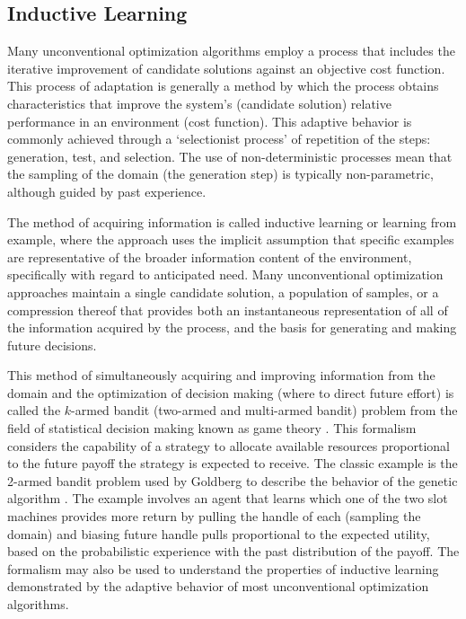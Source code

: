 \begin{bibunit}
% 
% 
\subsection{Inductive Learning}
\label{subsec:induction}
Many unconventional optimization algorithms employ a process that includes the iterative improvement of candidate solutions against an objective cost function. This process of adaptation is generally a method by which the process obtains characteristics that improve the system's (candidate solution) relative performance in an environment (cost function). This adaptive behavior is commonly achieved through a `selectionist process' of repetition of the steps: generation, test, and selection. The use of non-deterministic processes mean that the sampling of the domain (the generation step) is typically non-parametric, although guided by past experience. 

The method of acquiring information is called inductive learning or learning from example, where the approach uses the implicit assumption that specific examples are representative of the broader information content of the environment, specifically with regard to anticipated need. Many unconventional optimization approaches maintain a single candidate solution, a population of samples, or a compression thereof that provides both an instantaneous representation of all of the information acquired by the process, and the basis for generating and making future decisions. 

This method of simultaneously acquiring and improving information from the domain and the optimization of decision making (where to direct future effort) is called the $k$-armed bandit (two-armed and multi-armed bandit) problem from the field of statistical decision making known as game theory \cite{Robbins1952, Bergemann2006}. This formalism considers the capability of a strategy to allocate available resources proportional to the future payoff the strategy is expected to receive. The classic example is the 2-armed bandit problem used by Goldberg to describe the behavior of the genetic algorithm \cite{Goldberg1989}. The example involves an agent that learns which one of the two slot machines provides more return by pulling the handle of each (sampling the domain) and biasing future handle pulls proportional to the expected utility, based on the probabilistic experience with the past distribution of the payoff. The formalism may also be used to understand the properties of inductive learning demonstrated by the adaptive behavior of most unconventional optimization algorithms.


\end{bibunit}
